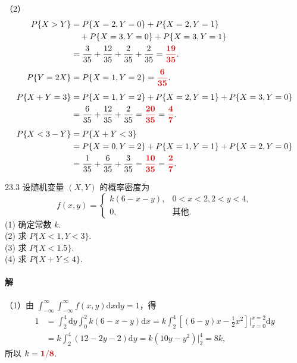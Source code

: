\documentclass[11pt, UTF8]{ctexart}
\newcommand{\ans}[1]{\mathbf{\color{fred}#1}}
\begin{document}
（2）
\begin{align*}
P\{X > Y\} &= P\{X = 2, Y = 0\} + P\{X = 2, Y = 1\} \\
&\quad + P\{X = 3, Y = 0\} + P\{X = 3, Y = 1\} \\
&= \frac{3}{35} + \frac{12}{35} + \frac{2}{35} + \frac{2}{35} = \ans{\frac{19}{35}}. \\[1ex]
P\{Y = 2X\} &= P\{X = 1, Y = 2\} = \ans{\frac{6}{35}}. \\[1ex]
P\{X + Y = 3\} &= P\{X = 1, Y = 2\} + P\{X = 2, Y = 1\} + P\{X = 3, Y = 0\} \\
&= \frac{6}{35} + \frac{12}{35} + \frac{2}{35} = \ans{\frac{20}{35}} = \ans{\frac{4}{7}}. \\[1ex]
P\{X < 3 - Y\} &= P\{X + Y < 3\} \\
&= P\{X = 0, Y = 2\} + P\{X = 1, Y = 1\} + P\{X = 2, Y = 0\} \\
&= \frac{1}{35} + \frac{6}{35} + \frac{3}{35} = \ans{\frac{10}{35}} = \ans{\frac{2}{7}}.
\end{align*}

\vspace{1.5em}

\begin{problem}{2}{3.3}
设随机变量 $(X, Y)$ 的概率密度为
\[ f(x, y) = \begin{cases} k(6 - x - y), & 0 < x < 2, 2 < y < 4, \\ 0, & \text{其他.} \end{cases} \]
(1) 确定常数 $k$. \\
(2) 求 $P\{X < 1, Y < 3\}$. \\
(3) 求 $P\{X < 1.5\}$. \\
(4) 求 $P\{X + Y \leqslant 4\}$.
\end{problem}

\paragraph{\color{fblue}解}
（1）由 $\int_{-\infty}^{\infty}\int_{-\infty}^{\infty} f(x, y)\mathrm{d}x\mathrm{d}y = 1$，得
\begin{align*}
1 &= \int_{2}^{4} \mathrm{d}y \int_{0}^{2} k(6 - x - y)\mathrm{d}x = k \int_{2}^{4} \left[ (6 - y)x - \frac{1}{2}x^2 \right]\Big|_{x=0}^{x=2} \mathrm{d}y \\
&= k \int_{2}^{4} (12 - 2y - 2)\mathrm{d}y = k(10y - y^2)\Big|_{2}^{4} = 8k,
\end{align*}
所以 $k = \ans{1/8}$.
\end{document}
